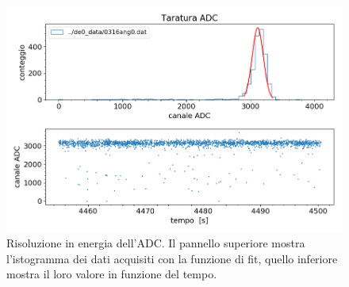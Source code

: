 \begin{figure}[h]
\centering
\includegraphics[width=23 em]{immagini/cal_provv}
\caption{Risoluzione in energia dell'ADC. Il pannello superiore mostra l'istogramma dei dati acquisiti con la funzione di fit, quello inferiore mostra il loro valore in funzione del tempo.}
\label{tara}
\end{figure}